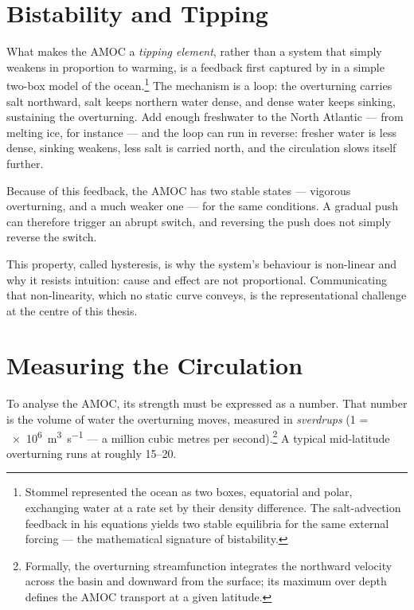 \section{Bistability and Tipping}
\label{sec:bg-bistability}

What makes the AMOC a \emph{tipping element}, rather than a system that simply weakens in proportion to warming, is a feedback first captured by \citet{stommel1961} in a simple two-box model of the ocean.\footnote{Stommel represented the ocean as two boxes, equatorial and polar, exchanging water at a rate set by their density difference. The salt-advection feedback in his equations yields two stable equilibria for the same external forcing --- the mathematical signature of bistability.} The mechanism is a loop: the overturning carries salt northward, salt keeps northern water dense, and dense water keeps sinking, sustaining the overturning. Add enough freshwater to the North Atlantic --- from melting ice, for instance --- and the loop can run in reverse: fresher water is less dense, sinking weakens, less salt is carried north, and the circulation slows itself further.

Because of this feedback, the AMOC has two stable states --- vigorous overturning, and a much weaker one --- for the same conditions. A gradual push can therefore trigger an abrupt switch, and reversing the push does not simply reverse the switch.

This property, called hysteresis, is why the system's behaviour is non-linear and why it resists intuition: cause and effect are not proportional. Communicating that non-linearity, which no static curve conveys, is the representational challenge at the centre of this thesis.

\section{Measuring the Circulation}
\label{sec:bg-measurement}

To analyse the AMOC, its strength must be expressed as a number. That number is the volume of water the overturning moves, measured in \emph{sverdrups} (\SI{1}{\sverdrup} = \SI{e6}{\cubic\metre\per\second} --- a million cubic metres per second).\footnote{Formally, the overturning streamfunction integrates the northward velocity across the basin and downward from the surface; its maximum over depth defines the AMOC transport at a given latitude.} A typical mid-latitude overturning runs at roughly \SIrange{15}{20}{\sverdrup}.

